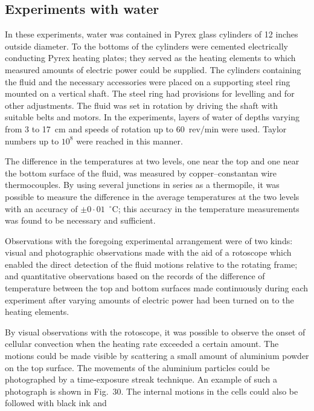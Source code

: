 \subsection{Experiments with water}
\label{sec:35a}

In these experiments, water was contained in Pyrex glass cylinders
of 12 inches outside diameter.  To the bottoms of the cylinders were
cemented electrically conducting Pyrex heating plates; they served as
the heating elements to which measured amounts of electric power could
be supplied.  The cylinders containing the fluid and the necessary
accessories were placed on a supporting steel ring mounted on a vertical
shaft.  The steel ring had provisions for levelling and for other adjust\-ments.
The fluid was set in rotation by driving the shaft with suitable
belts and motors.  In the experiments, layers of water of depths varying
from 3 to 17~cm and speeds of rotation up to 60~rev/min were used.  Taylor
numbers up to $10^8$ were reached in this manner.

The difference in the temperatures at two levels, one near the top and
one near the bottom surface of the fluid, was measured by copper--constantan
wire thermocouples.  By using several junctions in series as
a thermopile, it was possible to measure the difference in the average
temperatures at the two levels with an accuracy of $\pm 0{\cdot}01$~$^\circ$C; this
accuracy in the temperature measurements was found to be necessary
and sufficient.

Observations with the foregoing experimental arrangement were of
two kinds: visual and photographic observations made with the aid of a
rotoscope which enabled the direct detection of the fluid motions
relative to the rotating frame; and quantitative observations based on
the records of the difference of temperature between the top and bottom
surfaces made continuously during each experiment after varying
amounts of electric power had been turned on to the heating elements.

By visual observations with the rotoscope, it was possible to observe
the onset of cellular convection when the heating rate exceeded a certain
amount.  The motions could be made visible by scattering a small
amount of aluminium powder on the top surface.  The movements of the
aluminium particles could be photographed by a time-exposure streak
technique.  An example of such a photograph is shown in Fig.~30.  The
internal motions in the cells could also be followed with black ink and

